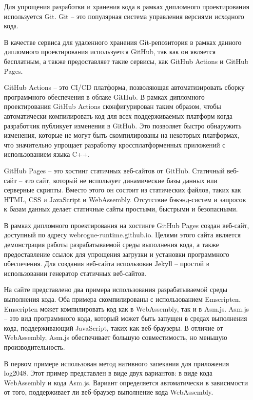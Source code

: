 Для упрощения разработки и хранения кода в рамках дипломного проектирования используется Git.
Git -- это популярная система управления версиями исходного кода.

В качестве сервиса для удаленного хранения Git-репозитория в рамках данного дипломного проектирования используется GitHub, так как он является бесплатным, а также предоставляет такие сервисы, как GitHub Actions и GitHub Pages.

GitHub Actions -- это CI/CD платформа, позволяющая автоматизировать сборку программного обеспечения в облаке GitHub.
В рамках дипломного проектирования GitHub Actions сконфигурирован таким образом, чтобы автоматически компилировать код для всех поддерживаемых платформ когда разработчик публикует изменения в GitHub.
Это позволяет быстро обнаружить изменения, которые не могут быть скомпилированы на некоторых платформах, что значительно упрощает разработку кроссплатформенных приложений с использованием языка C++.

GitHub Pages -- это хостинг статичных веб-сайтов от GitHub.
Статичный веб-сайт -- это сайт, который не использует динамические базы данных или серверные скрипты. 
Вместо этого он состоит из статических файлов, таких как HTML, CSS и JavaScript и WebAssembly.
Отсутствие бэкэнд-систем и запросов к базам данных делает статичные сайты простыми, быстрыми и безопасными.

В рамках дипломного проектирования на хостинге GitHub Pages создан веб-сайт, доступный по адресу webrogue-runtime.github.io.
Целями этого сайта является демонстрация работы разрабатываемой среды выполнения кода, а также предоставление ссылок для упрощения загрузки и установки программного обеспечения.
Для создания веб-сайта использован Jekyll -- простой в использовании генератор статичных веб-сайтов.

На сайте представлено два примера использования разрабатываемой среды выполнения кода.
Оба примера скомпилированы с использованием Emscripten.
Emscripten может компилировать код как в WebAssembly, так и в Asm.js.
Asm.js -- это вид программного кода, который может быть запущен в средах выполнения кода, поддерживающий JavaScript, таких как веб-браузеры.
В отличие от WebAssembly, Asm.js обеспечивает большую совместимость, но меньшую производительность.

В первом примере использован метод нативного запекания для приложения log2048.
Этот пример представлен в виде двух вариантов: в виде кода WebAssembly и кода Asm.js.
Вариант определяется автоматически в зависимости от того, поддерживает ли веб-браузер выполнение кода WebAssembly.

